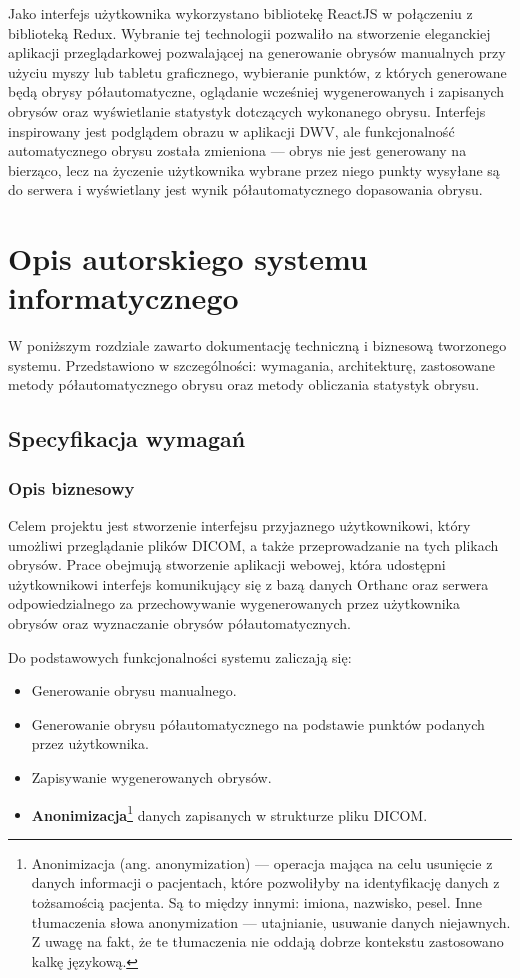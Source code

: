 \documentclass[a4paper,11pt,twoside]{report}
\theoremstyle{definition}
\begin{document}
Jako interfejs użytkownika wykorzystano bibliotekę ReactJS w połączeniu z biblioteką Redux. Wybranie tej technologii pozwaliło na stworzenie eleganckiej aplikacji przeglądarkowej pozwalającej na generowanie obrysów manualnych przy użyciu myszy lub tabletu graficznego, wybieranie punktów, z których generowane będą obrysy półautomatyczne, oglądanie wcześniej wygenerowanych i zapisanych obrysów oraz wyświetlanie statystyk dotczących wykonanego obrysu. Interfejs inspirowany jest podglądem obrazu w aplikacji DWV, ale funkcjonalność automatycznego obrysu została zmieniona --- obrys nie jest generowany na bierząco, lecz na życzenie użytkownika wybrane przez niego punkty wysyłane są do serwera i wyświetlany jest wynik półautomatycznego dopasowania obrysu.

\chapter {Opis autorskiego systemu informatycznego}

W poniższym rozdziale zawarto dokumentację techniczną i biznesową tworzonego systemu. Przedstawiono w szczególności: wymagania, architekturę, zastosowane metody półautomatycznego obrysu oraz metody obliczania statystyk obrysu.

\section {Specyfikacja wymagań}

\subsection {Opis biznesowy}

Celem projektu jest stworzenie interfejsu przyjaznego użytkownikowi, który umożliwi przeglądanie plików DICOM, a także przeprowadzanie na tych plikach obrysów. Prace obejmują stworzenie aplikacji webowej, która udostępni użytkownikowi interfejs komunikujący się z bazą danych Orthanc oraz serwera odpowiedzialnego za przechowywanie wygenerowanych przez użytkownika obrysów oraz wyznaczanie obrysów półautomatycznych. 

Do podstawowych funkcjonalności systemu zaliczają się:
\begin{itemize}[noitemsep]
\item Generowanie obrysu manualnego.
\item Generowanie obrysu półautomatycznego na podstawie punktów podanych przez użytkownika.
\item Zapisywanie wygenerowanych obrysów.
\item \textbf {Anonimizacja}\footnote {Anonimizacja (ang. anonymization) --- operacja mająca na celu usunięcie z danych informacji o pacjentach, które pozwoliłyby na identyfikację danych z tożsamością pacjenta. Są to między innymi: imiona, nazwisko, pesel. Inne tłumaczenia słowa anonymization --- utajnianie, usuwanie danych niejawnych. Z uwagę na fakt, że te tłumaczenia nie oddają dobrze kontekstu zastosowano kalkę językową.} danych zapisanych w strukturze pliku DICOM.
\end{itemize}
\end{document}
